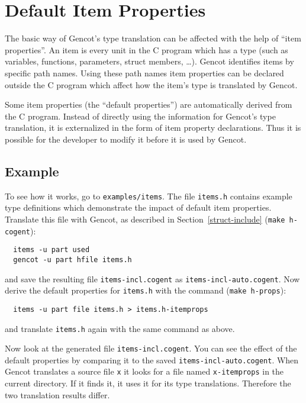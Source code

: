\documentclass[a4paper]{report}
\newcommand{\code}[1]{\textnormal{\texttt{#1}}}
\begin{document}
\section{Default Item Properties}
\label{types-dfltprops}

The basic way of Gencot's type translation can be affected with the help of ``item properties''. An item is 
every unit in the C program which has a type (such as variables, functions, parameters, struct members, \ldots).
Gencot identifies items by specific path names. Using these path names item properties can be declared outside
the C program which affect how the item's type is translated by Gencot.

Some item properties (the ``default properties'') are automatically derived from the C program. Instead of directly
using the information for Gencot's type translation, it is externalized in the form of item property declarations. 
Thus it is possible for the developer to modify it before it is used by Gencot.

\subsection{Example}
\label{types-dfltprops-example}

To see how it works, go to \code{examples/items}. The file \code{items.h} contains example type definitions
which demonstrate the impact of default item properties. Translate this file with Gencot, as described in 
Section~\ref{struct-include} (\code{make h-cogent}): 
\begin{verbatim}
  items -u part used
  gencot -u part hfile items.h
\end{verbatim}
and save the resulting file \code{items-incl.cogent} as \code{items-incl-auto.cogent}. Now derive the default 
properties for \code{items.h} with the command (\code{make h-props}):
\begin{verbatim}
  items -u part file items.h > items.h-itemprops
\end{verbatim}
and translate \code{items.h} again with the same command as above. 

Now look at the generated file \code{items-incl.cogent}. You can see the effect of the default properties by 
comparing it to the saved \code{items-incl-auto.cogent}. When Gencot translates a source file \code{x} it looks
for a file named \code{x-itemprops} in the current directory. If it finds it, it uses it for its type translations.
Therefore the two translation results differ.
\end{document}
